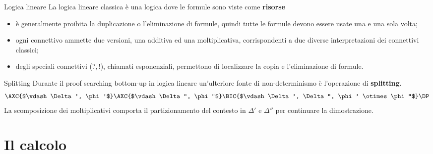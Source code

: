 \documentclass{beamer}
\newcommand{\llten}{\otimes}
\begin{document}
\begin{frame}{Logica lineare}
	La logica lineare classica è una logica dove le formule sono viste come \textbf{risorse}
	\begin{itemize}
		\item è generalmente proibita la duplicazione o l'eliminazione di formule, quindi tutte le formule devono essere usate una e una sola volta;
		\item ogni connettivo ammette due versioni, una additiva ed una moltiplicativa, corrispondenti a due diverse interpretazioni dei connettivi classici;
		\item degli speciali connettivi ($?, !$), chiamati esponenziali, permettono di localizzare la copia e l'eliminazione di formule.
	\end{itemize}
\end{frame}

\begin{frame}{Splitting}
	Durante il proof searching bottom-up in logica lineare un'ulteriore fonte di non-determinismo è l'operazione di \textbf{splitting}.
	$$
	\AXC{$\vdash \Delta', \phi'$}
	\AXC{$\vdash \Delta'', \phi''$}
	\LeftLabel{$\llten$}
	\BIC{$\vdash \Delta', \Delta'', \phi' \llten \phi''$}
	\DP
	$$
	La scomposizione dei moltiplicativi comporta il partizionamento del contesto in $\Delta'$ e $\Delta''$ per continuare la dimostrazione.
\end{frame}

\section{Il calcolo}

% 

% 
\end{document}
